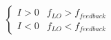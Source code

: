 \documentclass[preview]{standalone}
\begin{document}
\begin{align*}
\begin{cases}I > 0 & f_{LO} > f_{feedback} \\I < 0 & f_{LO} < f_{feedback}\end{cases}
\end{align*}
\end{document}
